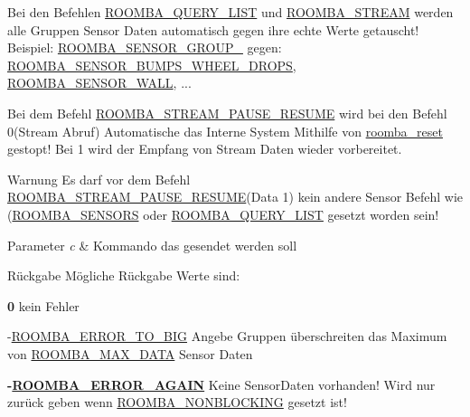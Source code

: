 Bei den Befehlen \hyperlink{group__roomba__commands__sensor_gaa4ae696773b751ed0b4828ebe3861d69}{R\-O\-O\-M\-B\-A\-\_\-\-Q\-U\-E\-R\-Y\-\_\-\-L\-I\-S\-T} und \hyperlink{group__roomba__commands__sensor_gafc6423e54083bd2b1abc99198bbbf739}{R\-O\-O\-M\-B\-A\-\_\-\-S\-T\-R\-E\-A\-M} werden alle Gruppen Sensor Daten automatisch gegen ihre echte Werte getauscht! Beispiel\-: \hyperlink{group__roomba__sensor__group_ga40a35c78fe86679d04381b8c69488766}{R\-O\-O\-M\-B\-A\-\_\-\-S\-E\-N\-S\-O\-R\-\_\-\-G\-R\-O\-U\-P\-\_} gegen\-: \hyperlink{group__roomba__sensor__extern_ga52d4985b7063d9a96315c241657620a3}{R\-O\-O\-M\-B\-A\-\_\-\-S\-E\-N\-S\-O\-R\-\_\-\-B\-U\-M\-P\-S\-\_\-\-W\-H\-E\-E\-L\-\_\-\-D\-R\-O\-P\-S}, \hyperlink{group__roomba__sensor__extern_ga5398879cecaf2fcfb997b4e3cba53f88}{R\-O\-O\-M\-B\-A\-\_\-\-S\-E\-N\-S\-O\-R\-\_\-\-W\-A\-L\-L}, ...

Bei dem Befehl \hyperlink{group__roomba__commands__sensor_ga6389061ebdb4feec1198ea5c4f6fae55}{R\-O\-O\-M\-B\-A\-\_\-\-S\-T\-R\-E\-A\-M\-\_\-\-P\-A\-U\-S\-E\-\_\-\-R\-E\-S\-U\-M\-E} wird bei den Befehl 0(Stream Abruf) Automatische das Interne System Mithilfe von \hyperlink{group__reader_ga37eb8be9c6766f717f12e83837cd1cd9}{roomba\-\_\-reset} gestopt! Bei 1 wird der Empfang von Stream Daten wieder vorbereitet.

\begin{DoxyWarning}{Warnung}
Es darf vor dem Befehl \hyperlink{group__roomba__commands__sensor_ga6389061ebdb4feec1198ea5c4f6fae55}{R\-O\-O\-M\-B\-A\-\_\-\-S\-T\-R\-E\-A\-M\-\_\-\-P\-A\-U\-S\-E\-\_\-\-R\-E\-S\-U\-M\-E}(Data 1) kein andere Sensor Befehl wie (\hyperlink{group__roomba__commands__sensor_gaef0d27b1b9b49c6aaa0a7241e7e41201}{R\-O\-O\-M\-B\-A\-\_\-\-S\-E\-N\-S\-O\-R\-S} oder \hyperlink{group__roomba__commands__sensor_gaa4ae696773b751ed0b4828ebe3861d69}{R\-O\-O\-M\-B\-A\-\_\-\-Q\-U\-E\-R\-Y\-\_\-\-L\-I\-S\-T} gesetzt worden sein!
\end{DoxyWarning}

\begin{DoxyParams}{Parameter}
{\em c} & Kommando das gesendet werden soll\\
\hline
\end{DoxyParams}
\begin{DoxyReturn}{Rückgabe}
Mögliche Rückgabe Werte sind\-:
\end{DoxyReturn}

\begin{DoxyItemize}
\item {\bfseries 0} kein Fehler
\item -\/\hyperlink{group__roomba__error_ga685837574afe13c559db50cb9b5c012a}{R\-O\-O\-M\-B\-A\-\_\-\-E\-R\-R\-O\-R\-\_\-\-T\-O\-\_\-\-B\-I\-G} Angebe Gruppen überschreiten das Maximum von \hyperlink{group__roomba__def_ga53c32c129fde6d7594f43690d6d81d97}{R\-O\-O\-M\-B\-A\-\_\-\-M\-A\-X\-\_\-\-D\-A\-T\-A} Sensor Daten
\item {\bfseries -\/\hyperlink{group__roomba__error_gad35f7cffbb363514d9453cea041593e4}{R\-O\-O\-M\-B\-A\-\_\-\-E\-R\-R\-O\-R\-\_\-\-A\-G\-A\-I\-N}} Keine Sensor\-Daten vorhanden! Wird nur zurück geben wenn \hyperlink{group__reader_gad57079c91b29054a870a52e296de7c8f}{R\-O\-O\-M\-B\-A\-\_\-\-N\-O\-N\-B\-L\-O\-C\-K\-I\-N\-G} gesetzt ist! 
\end{DoxyItemize}
